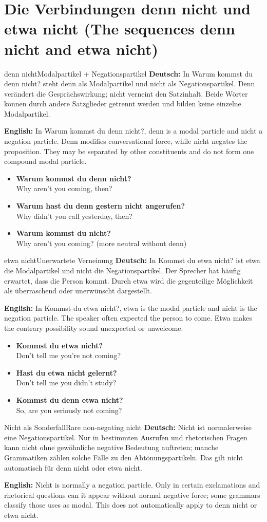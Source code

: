 \documentclass[a4paper,11pt]{article}
\newcommand{\GermanText}[1]{\textbf{Deutsch: }#1\par}
\newcommand{\EnglishText}[1]{{\small\color{SoftGray}\textbf{English: }#1\par}}
\newcommand{\ExampleItem}[2]{\item \textbf{#1}\\{\small\color{SoftGray}#2}}
\begin{document}
\section{Die Verbindungen denn nicht und etwa nicht \textnormal{(The sequences denn nicht and etwa nicht)}}
\begin{grammarentry}{denn nicht}{Modalpartikel + Negationspartikel}
\GermanText{In Warum kommst du denn nicht? steht denn als Modalpartikel und nicht als Negationspartikel. Denn verändert die Gesprächswirkung; nicht verneint den Satzinhalt. Beide Wörter können durch andere Satzglieder getrennt werden und bilden keine einzelne Modalpartikel.}
\EnglishText{In Warum kommst du denn nicht?, denn is a modal particle and nicht a negation particle. Denn modifies conversational force, while nicht negates the proposition. They may be separated by other constituents and do not form one compound modal particle.}
\end{grammarentry}
\begin{exbox}\begin{itemize}
\ExampleItem{Warum kommst du denn nicht?}{Why aren't you coming, then?}
\ExampleItem{Warum hast du denn gestern nicht angerufen?}{Why didn't you call yesterday, then?}
\ExampleItem{Warum kommst du nicht?}{Why aren't you coming? (more neutral without denn)}
\end{itemize}\end{exbox}
\begin{grammarentry}{etwa nicht}{Unerwartete Verneinung}
\GermanText{In Kommst du etwa nicht? ist etwa die Modalpartikel und nicht die Negationspartikel. Der Sprecher hat häufig erwartet, dass die Person kommt. Durch etwa wird die gegenteilige Möglichkeit als überraschend oder unerwünscht dargestellt.}
\EnglishText{In Kommst du etwa nicht?, etwa is the modal particle and nicht is the negation particle. The speaker often expected the person to come. Etwa makes the contrary possibility sound unexpected or unwelcome.}
\end{grammarentry}
\begin{exbox}\begin{itemize}
\ExampleItem{Kommst du etwa nicht?}{Don't tell me you're not coming?}
\ExampleItem{Hast du etwa nicht gelernt?}{Don't tell me you didn't study?}
\ExampleItem{Kommst du denn etwa nicht?}{So, are you seriously not coming?}
\end{itemize}\end{exbox}
\begin{grammarentry}{Nicht als Sonderfall}{Rare non-negating nicht}
\GermanText{Nicht ist normalerweise eine Negationspartikel. Nur in bestimmten Ausrufen und rhetorischen Fragen kann nicht ohne gewöhnliche negative Bedeutung auftreten; manche Grammatiken zählen solche Fälle zu den Abtönungspartikeln. Das gilt nicht automatisch für denn nicht oder etwa nicht.}
\EnglishText{Nicht is normally a negation particle. Only in certain exclamations and rhetorical questions can it appear without normal negative force; some grammars classify those uses as modal. This does not automatically apply to denn nicht or etwa nicht.}
\end{grammarentry}
\end{document}
